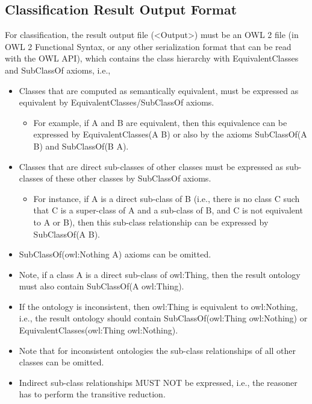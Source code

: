 \documentclass{article}
\begin{document}
\subsection{Classification Result Output Format}
For classification, the result output file (\textless Output\textgreater{}) must be an OWL 2 file (in OWL 2 Functional Syntax, or any other serialization format that can be read with the OWL API), which contains the class hierarchy with EquivalentClasses and SubClassOf axioms, i.e.,
\begin{itemize}
\item Classes that are computed as semantically equivalent, must be expressed as equivalent by EquivalentClasses/SubClassOf axioms.
\begin{itemize}
\item For example, if A and B are equivalent, then this equivalence can be expressed by EquivalentClasses(A B) or also by the axioms SubClassOf(A B) and SubClassOf(B A).
\end{itemize}
\item Classes that are direct sub-classes of other classes must be expressed as sub-classes of these other classes by SubClassOf axioms.
\begin{itemize}
\item For instance, if A is a direct sub-class of B (i.e., there is no class C such that C is a super-class of A and a sub-class of B, and C is not equivalent to A or B), then this sub-class relationship can be expressed by SubClassOf(A B).
\end{itemize}
\item SubClassOf(owl:Nothing A) axioms can be omitted.
\item Note, if a class A is a direct sub-class of owl:Thing, then the result ontology must also contain SubClassOf(A owl:Thing).
\item If the ontology is inconsistent, then owl:Thing is equivalent to owl:Nothing, i.e., the result ontology should contain SubClassOf(owl:Thing owl:Nothing) or EquivalentClasses(owl:Thing owl:Nothing).
\item Note that for inconsistent ontologies the sub-class relationships of all other classes can be omitted.
\item Indirect sub-class relationships MUST NOT be expressed, i.e., the reasoner has to perform the transitive reduction.
\end{itemize}
\end{document}

